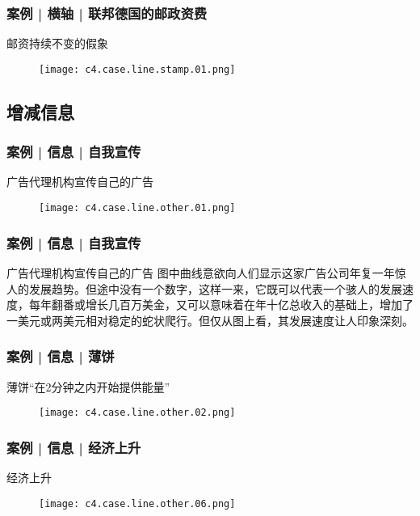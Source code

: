 \begin{frame}
  \frametitle{案例 | 横轴 | 联邦德国的邮政资费}
  \begin{block}{邮资持续不变的假象}
    \begin{figure}
      \centering
      \texttt{[image: c4.case.line.stamp.01.png]}
    \end{figure}
  \end{block}
\end{frame}

\subsection{增减信息}
\begin{frame}
  \frametitle{案例 | 信息 | 自我宣传}
  \begin{block}{广告代理机构宣传自己的广告}
    \begin{figure}
      \centering
      \texttt{[image: c4.case.line.other.01.png]}
    \end{figure}
  \end{block}
\end{frame}

\begin{frame}
  \frametitle{案例 | 信息 | 自我宣传}
  \begin{block}{广告代理机构宣传自己的广告}
图中曲线意欲向人们显示这家广告公司年复一年惊人的发展趋势。但途中没有一个数字，这样一来，它既可以代表一个骇人的发展速度，每年翻番或增长几百万美金，又可以意味着在年十亿总收入的基础上，增加了一美元或两美元相对稳定的蛇状爬行。但仅从图上看，其发展速度让人印象深刻。
  \end{block}
\end{frame}

\begin{frame}
  \frametitle{案例 | 信息 | 薄饼}
  \begin{block}{薄饼“在2分钟之内开始提供能量”}
    \begin{figure}
      \centering
      \texttt{[image: c4.case.line.other.02.png]}
    \end{figure}
  \end{block}
\end{frame}

\begin{frame}
  \frametitle{案例 | 信息 | 经济上升}
  \begin{block}{经济上升}
  \begin{figure}
    \centering
    \texttt{[image: c4.case.line.other.06.png]}
  \end{figure}
  \end{block}
\end{frame}

